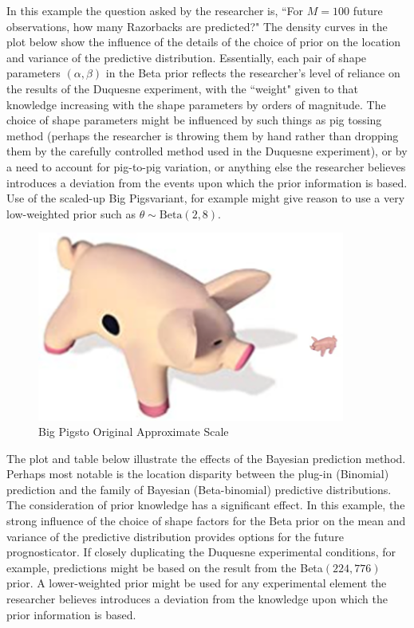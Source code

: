 \documentclass[12pt, a4paper]{article}
\begin{document}
\noindent In this example the question asked by the researcher is, ``For $M = 100$ future observations, how many Razorbacks are predicted?"  The density curves in the plot below show the influence of the details of the choice of prior on the location and variance of the predictive distribution.  Essentially, each pair of shape parameters $(\alpha,\beta)$ in the Beta prior reflects the researcher's level of reliance on the results of the Duquesne experiment, with the ``weight" given to that knowledge increasing with the shape parameters by orders of magnitude.  The choice of shape parameters might be influenced by such things as pig tossing method (perhaps the researcher is throwing them by hand rather than dropping them by the carefully controlled method used in the Duquesne experiment), or by a need to account for pig-to-pig variation, or anything else the researcher believes introduces a deviation from the events upon which the prior information is based.  Use of the scaled-up Big Pigs\texttrademark variant, for example might give reason to use a very low-weighted prior such as $\theta\sim\text{Beta}(2,8)$.

\begin{figure}[ht]
  \centering
  \includegraphics[width=0.9\textwidth]{./Graphics/PassThePigs/PigSize}
  \caption{Big Pigs\texttrademark to Original Approximate Scale}
\end{figure}


\noindent The plot and table below illustrate the effects of the Bayesian prediction method. Perhaps most notable is the location disparity between the plug-in (Binomial) prediction and the family of Bayesian (Beta-binomial) predictive distributions.  The consideration of prior knowledge has a significant effect.  In this example, the strong influence of the choice of shape factors for the Beta prior on the mean and variance of the predictive distribution provides options for the future prognosticator. If closely duplicating the Duquesne experimental conditions, for example, predictions might be based on the result from the Beta$(224,776)$ prior.  A lower-weighted prior might be used for any experimental element the researcher believes introduces a deviation from the knowledge upon which the prior information is based.
\end{document}
